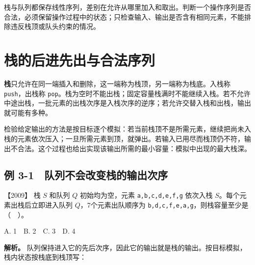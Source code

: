 栈与队列都保存线性序列，差别在允许从哪里加入和取出。判断一个操作序列是否合法，必须保留操作过程中的状态；只检查输入、输出是否含有相同元素，不能排除违反栈顶或队头约束的情况。

\section{栈的后进先出与合法序列}\label{ds-03-01}

\textbf{栈}只允许在同一端插入和删除，这一端称为栈顶，另一端称为栈底。入栈称 \texttt{push}，出栈称 \texttt{pop}。栈为空时不能出栈；固定容量栈满时不能继续入栈。若不允许中途出栈，一批元素的出栈次序是入栈次序的逆序；若允许交替入栈和出栈，输出就可能有多种。

检验给定输出的方法是按目标逐个模拟：若当前栈顶不是所需元素，继续把尚未入栈的元素依次压入；一旦所需元素到顶，就弹出。若输入已用尽而栈顶仍不符，输出不合法。这个过程也给出实现该输出所需的最小容量：模拟中出现的最大栈深。

\subsection{例 3-1　队列不会改变栈的输出次序}\label{ds-ex3-1}

\noindent{}【2009】 栈 \(S\) 和队列 \(Q\) 初始均为空，元素 \texttt{a,}\allowbreak{}\texttt{b,}\allowbreak{}\texttt{c,}\allowbreak{}\texttt{d,}\allowbreak{}\texttt{e,}\allowbreak{}\texttt{f,}\allowbreak{}\texttt{g} 依次入栈 \(S\)。每个元素出栈后立即进入队列 \(Q\)，7个元素出队顺序为 \texttt{b,}\allowbreak{}\texttt{d,}\allowbreak{}\texttt{c,}\allowbreak{}\texttt{f,}\allowbreak{}\texttt{e,}\allowbreak{}\texttt{a,}\allowbreak{}\texttt{g}，则栈容量至少是（　）。

A. 1　B. 2　C. 3　D. 4


\textbf{解析。} 队列保持进入它的先后次序，因此它的输出就是栈的输出。按目标模拟，栈内状态按栈底到栈顶写：

